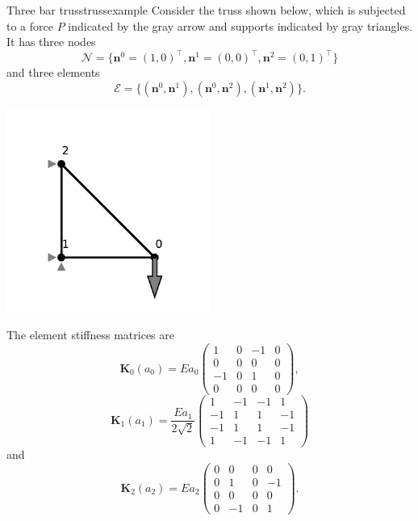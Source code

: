\begin{example}{Three bar truss}{trussexample}
    Consider the truss shown below, which is subjected to a force $P$ indicated by the gray arrow and supports indicated by gray triangles. It has three nodes 
    \begin{equation}
        \mathcal{N} = \{\mathbf{n}^0=(1,0)^\top, \mathbf{n}^1=(0,0)^\top,\mathbf{n}^2=(0,1)^\top \}
    \end{equation}
    and three elements 
    \begin{equation}
        \mathcal{E} = \{(\mathbf{n}^0, \mathbf{n}^1), (\mathbf{n}^0, \mathbf{n}^2), (\mathbf{n}^1, \mathbf{n}^2)\}.
    \end{equation}

    \begin{center}
        \includegraphics[width=0.5\textwidth]{figures/three_bar_truss.pdf}
    \end{center}

    The element stiffness matrices are 
    \begin{equation}
        \mathbf{K}_0(a_0) = E a_0
        \begin{pmatrix}
             1 & 0 & -1 & 0 \\
             0 & 0 &  0 & 0 \\
            -1 & 0 &  1 & 0 \\
             0 & 0 &  0 & 0
        \end{pmatrix},
    \end{equation}
    \begin{equation}
        \mathbf{K}_1(a_1) = \frac{E a_1}{2\sqrt{2}}
        \begin{pmatrix}
             1 & -1 & -1 &  1 \\
            -1 &  1 &  1 & -1 \\
            -1 &  1 &  1 & -1 \\
             1 & -1 & -1 &  1
        \end{pmatrix}
    \end{equation}
    and 
    \begin{equation}
        \mathbf{K}_2(a_2) = E a_2
        \begin{pmatrix}
            0 &  0 & 0 &  0 \\
            0 &  1 & 0 & -1 \\
            0 &  0 & 0 &  0 \\
            0 & -1 & 0 &  1 
        \end{pmatrix}.
    \end{equation}


\end{example}
